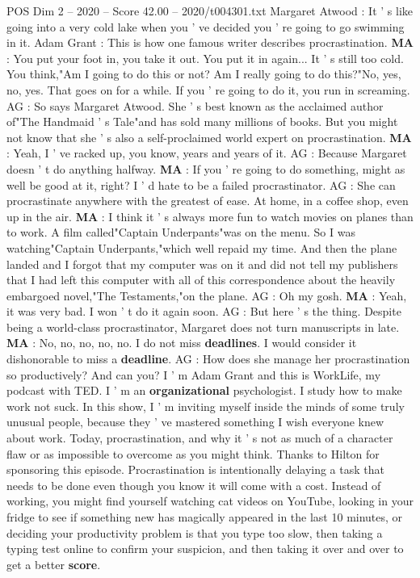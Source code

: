 \begin{textsample}{POS Dim 2 – 2020 – Score 42.00 – 2020/t004301.txt}  \label{ex:f2_pos_008}
Margaret Atwood : It ' s like going into a very cold lake when you ' ve decided you ' re going to go swimming in it.
Adam Grant : This is how one famous writer describes procrastination. \textbf{MA} : You put your foot in, you take it out.
You put it in again...
It ' s still too cold.
You think,"Am I going to do this or not?
Am I really going to do this?"No, yes, no, yes.
That goes on for a while.
If you ' re going to do it, you run in screaming.
AG : So says Margaret Atwood.
She ' s best known as the acclaimed author of"The Handmaid ' s Tale"and has sold many millions of books.
But you might not know that she ' s also a self-proclaimed world expert on procrastination. \textbf{MA} : Yeah, I ' ve racked up, you know, years and years of it.
AG : Because Margaret doesn ' t do anything halfway. \textbf{MA} : If you ' re going to do something, might as well be good at it, right?
I ' d hate to be a failed procrastinator.
AG : She can procrastinate anywhere with the greatest of ease.
At home, in a coffee shop, even up in the air. \textbf{MA} : I think it ' s always more fun to watch movies on planes than to work.
A film called"Captain Underpants"was on the menu.
So I was watching"Captain Underpants,"which well repaid my time.
And then the plane landed and I forgot that my computer was on it and did not tell my publishers that I had left this computer with all of this correspondence about the heavily embargoed novel,"The Testaments,"on the plane.
AG : Oh my gosh. \textbf{MA} : Yeah, it was very bad.
I won ' t do it again soon.
AG : But here ' s the thing.
Despite being a world-class procrastinator, Margaret does not turn manuscripts in late. \textbf{MA} : No, no, no, no, no.
I do not miss \textbf{deadlines}.
I would consider it dishonorable to miss a \textbf{deadline}.
AG : How does she manage her procrastination so productively?
And can you?
I ' m Adam Grant and this is WorkLife, my podcast with TED.
I ' m an \textbf{organizational} psychologist.
I study how to make work not suck.
In this show, I ' m inviting myself inside the minds of some truly unusual people, because they ' ve mastered something I wish everyone knew about work.
Today, procrastination, and why it ' s not as much of a character flaw or as impossible to overcome as you might think.
Thanks to Hilton for sponsoring this episode.
Procrastination is intentionally delaying a task that needs to be done even though you know it will come with a cost.
Instead of working, you might find yourself watching cat videos on YouTube, looking in your fridge to see if something new has magically appeared in the last 10 minutes, or deciding your productivity problem is that you type too slow, then taking a typing test online to confirm your suspicion, and then taking it over and over to get a better \textbf{score}.

\end{textsample}
